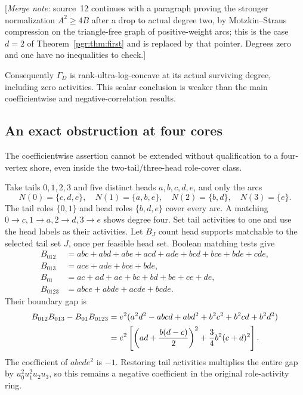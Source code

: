 \documentclass[11pt]{article}
\numberwithin{equation}{section}
\theoremstyle{definition}\newtheorem{definition}[theorem]{Definition}\newtheorem{remark}[theorem]{Remark}
\newcommand{\Ga}{\Gamma}                   %
\newcommand{\mnote}[1]{[\textit{Merge note:} #1]}
\begin{document}
\mnote{source~12 continues with a paragraph proving the stronger
normalization $A^2\ge4B$ after a drop to actual degree two, by
Motzkin--Straus compression on the triangle-free graph of positive-weight
arcs; this is the case $d=2$ of Theorem~\ref{pgr:thm:first} and is
replaced by that pointer. Degrees zero and one have no inequalities to
check.}


Consequently $\Ga_D$ is rank-ultra-log-concave at its actual surviving degree,
including zero activities. This scalar conclusion is weaker than the main
coefficientwise and negative-correlation results.

\subsection{An exact obstruction at four cores}\label{pgr:r:tc:sec:four}
The coefficientwise assertion cannot be extended without qualification to a
four-vertex shore, even inside the two-tail/three-head role-cover class.

Take tails $0,1,2,3$ and five distinct heads $a,b,c,d,e$, and only the arcs
\begin{equation}\label{pgr:r:tc:eq:fourgraph}
 N(0)=\{c,d,e\},\quad N(1)=\{a,b,e\},\quad
 N(2)=\{b,d\},\quad N(3)=\{e\}.
\end{equation}
The tail roles $\{0,1\}$ and head roles $\{b,d,e\}$ cover every arc. A
matching $0\to c,1\to a,2\to d,3\to e$ shows degree four.
Set tail activities to one and use the head labels as their activities.
Let $B_J$ count head supports matchable to the selected tail set $J$, once
per feasible head set. Boolean matching tests give
\begin{align*}
 B_{012}&=abc+abd+abe+acd+ade+bcd+bce+bde+cde,\\
 B_{013}&=ace+ade+bce+bde,\\
 B_{01}&=ac+ad+ae+bc+bd+be+ce+de,\\
 B_{0123}&=abce+abde+acde+bcde.
\end{align*}
Their boundary gap is
\begin{align}\label{pgr:r:tc:eq:fourgap}
 B_{012}B_{013}-B_{01}B_{0123}
 &=e^2(a^2d^2-abcd+abd^2+b^2c^2+b^2cd+b^2d^2)\notag\\
 &=e^2\left[\left(ad+\frac{b(d-c)}2\right)^2
                      +\frac34b^2(c+d)^2\right].
\end{align}
The coefficient of $abcde^2$ is $-1$. Restoring tail activities multiplies
the entire gap by $u_0^2u_1^2u_2u_3$, so this remains a negative coefficient
in the original role-activity ring.
\end{document}
